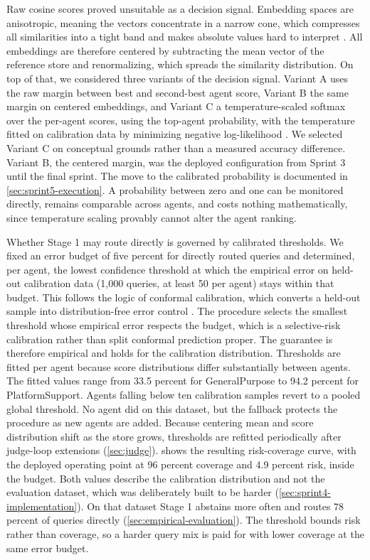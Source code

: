 Raw cosine scores proved unsuitable as a decision signal. Embedding spaces are anisotropic, meaning the vectors concentrate in a narrow cone, which compresses all similarities into a tight band and makes absolute values hard to interpret \autocite{ethayarajh2019,steck2024}. All embeddings are therefore centered by subtracting the mean vector of the reference store and renormalizing, which spreads the similarity distribution. On top of that, we considered three variants of the decision signal. Variant A uses the raw margin between best and second-best agent score, Variant B the same margin on centered embeddings, and Variant C a temperature-scaled softmax over the per-agent scores, using the top-agent probability, with the temperature fitted on calibration data by minimizing negative log-likelihood \autocite{guo2017}. We selected Variant C on conceptual grounds rather than a measured accuracy difference. Variant B, the centered margin, was the deployed configuration from Sprint 3 until the final sprint. The move to the calibrated probability is documented in \cref{sec:sprint5-execution}. A probability between zero and one can be monitored directly, remains comparable across agents, and costs nothing mathematically, since temperature scaling provably cannot alter the agent ranking.

Whether Stage 1 may route directly is governed by calibrated thresholds. We fixed an error budget of five percent for directly routed queries and determined, per agent, the lowest confidence threshold at which the empirical error on held-out calibration data (1,000 queries, at least 50 per agent) stays within that budget. This follows the logic of conformal calibration, which converts a held-out sample into distribution-free error control \autocite{angelopoulos2023}. The procedure selects the smallest threshold whose empirical error respects the budget, which is a selective-risk calibration rather than split conformal prediction proper. The guarantee is therefore empirical and holds for the calibration distribution. Thresholds are fitted per agent because score distributions differ substantially between agents. The fitted values range from 33.5 percent for GeneralPurpose to 94.2 percent for PlatformSupport. Agents falling below ten calibration samples revert to a pooled global threshold. No agent did on this dataset, but the fallback protects the procedure as new agents are added. Because centering mean and score distribution shift as the store grows, thresholds are refitted periodically after judge-loop extensions (\cref{sec:judge}).  shows the resulting risk-coverage curve, with the deployed operating point at 96 percent coverage and 4.9 percent risk, inside the budget. Both values describe the calibration distribution and not the evaluation dataset, which was deliberately built to be harder (\cref{sec:sprint4-implementation}). On that dataset Stage 1 abstains more often and routes 78 percent of queries directly (\cref{sec:empirical-evaluation}). The threshold bounds risk rather than coverage, so a harder query mix is paid for with lower coverage at the same error budget.

